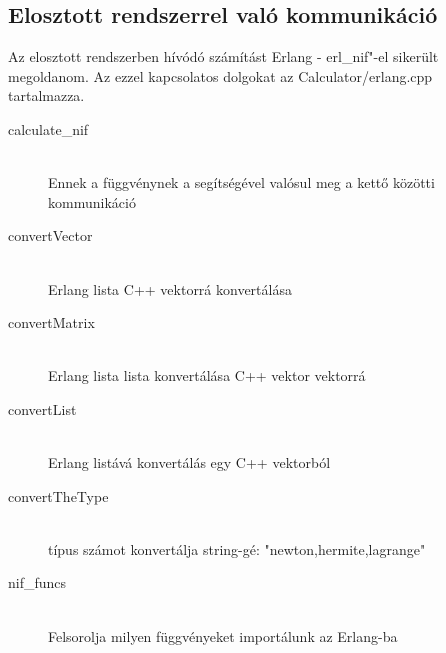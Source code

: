 \subsection{Elosztott rendszerrel való kommunikáció}
	Az elosztott rendszerben hívódó számítást Erlang - erl\_nif"-el sikerült megoldanom. 
	Az ezzel kapcsolatos dolgokat az Calculator/erlang.cpp tartalmazza.
	\begin{description}
		\item[calculate\_nif] \hfill \\
		Ennek a függvénynek a segítségével valósul meg a kettő közötti kommunikáció
		\item[convertVector] \hfill \\
		Erlang lista C++ vektorrá konvertálása
		\item[convertMatrix] \hfill \\
		Erlang lista lista konvertálása C++ vektor vektorrá
		\item[convertList] \hfill \\
		Erlang listává konvertálás egy C++ vektorból
		\item[convertTheType] \hfill \\
			típus számot konvertálja string-gé: 
			"newton,hermite,lagrange"
		\item[nif\_funcs] \hfill \\
			Felsorolja milyen függvényeket importálunk az Erlang-ba
	\end{description}
	
